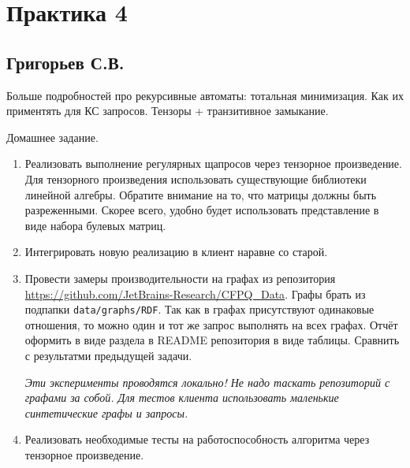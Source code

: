 \section{Практика 4}

\subsection{Григорьев С.В.}

Больше подробностей про рекурсивные автоматы: тотальная минимизация. Как их приментять для КС запросов. Тензоры + транзитивное замыкание.

Домашнее задание.
\begin{enumerate}
	\item Реализовать выполнение регулярных щапросов через тензорное произведение. Для тензорного произведения использовать существующие библиотеки линейной алгебры. Обратите внимание на то, что матрицы должны быть разреженными. Скорее всего, удобно будет использовать представление в виде набора булевых матриц.
	\item Интегрировать новую реализацию в клиент наравне со старой.
	\item Провести замеры производительности на графах из репозитория \url{https://github.com/JetBrains-Research/CFPQ_Data}. Графы брать из подпапки \verb|data/graphs/RDF|. Так как в графах присутствуют одинаковые отношения, то можно один и тот же запрос выполнять на всех графах. Отчёт оформить в виде раздела в  README репозитория в виде таблицы. Сравнить с результатми предыдущей задачи. 

	\textit{Эти эксперименты проводятся локально! Не надо таскать репозиторий с графами за собой. Для тестов клиента использовать маленькие синтетические графы и запросы.}
	\item Реализовать необходимые тесты на работоспособность алгоритма через тензорное произведение.
\end{enumerate} 
